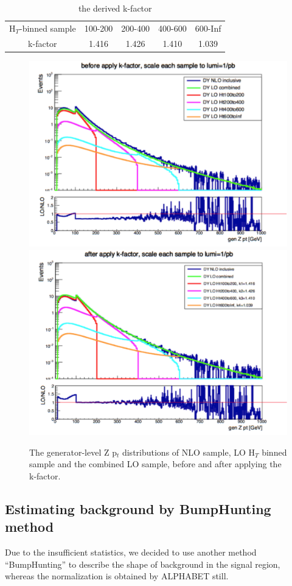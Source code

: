\documentclass{article}
\begin{document}
\begin{table}[]
\caption{the derived k-factor}
\label{my-label}
\centering
\setlength{\tabcolsep}{8pt}
\begin{tabular}{ c | c c c c }

H$_{T}$-binned sample   & 100-200  & 200-400  & 400-600  & 600-Inf  \\
k-factor           & 1.416    & 1.426    & 1.410    & 1.039    \\   

\end{tabular}
\end{table}


\begin{figure}
\centering
\includegraphics[width=.45\textwidth]{figures/beforeKFactorApply.pdf}\quad
\includegraphics[width=.45\textwidth]{figures/afterKFactorApply.pdf}
\caption{The generator-level Z p$_{t}$ distributions of NLO sample, LO H$_{T}$ binned sample and the combined LO sample, before and after applying the k-factor.}
\label{pics:blablabla}
\end{figure}


\subsection{Estimating background by BumpHunting method}

Due to the insufficient statistics, we decided to use another method ``BumpHunting'' to describe the shape of background in the signal region, whereas the normalization is obtained by ALPHABET still. 
\end{document}
